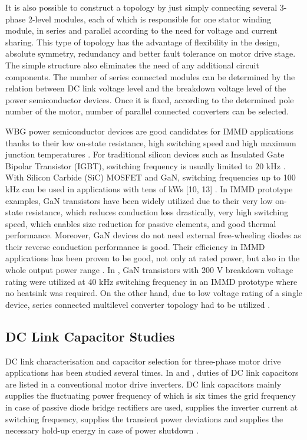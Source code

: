 \documentclass[conference,a4paper,twocolumn]{IEEEtran}
\begin{document}
It is also possible to construct a topology by just simply connecting several 3-phase 2-level modules, each of which is responsible for one stator winding module, in series and parallel according to the need for voltage and current sharing. This type of topology has the advantage of flexibility in the design, absolute symmetry, redundancy and better fault tolerance on motor drive stage. The simple structure also eliminates the need of any additional circuit components. The number of series connected modules can be determined by the relation between DC link voltage level and the breakdown voltage level of the power semiconductor devices. Once it is fixed, according to the determined pole number of the motor, number of parallel connected converters can be selected.

WBG power semiconductor devices are good candidates for IMMD applications thanks to their low on-state resistance, high switching speed and high maximum junction temperatures \cite{Morita2011}. For traditional silicon devices such as Insulated Gate Bipolar Transistor (IGBT), switching frequency is usually limited to 20 kHz \cite{Lambert2015a}. With Silicon Carbide (SiC) MOSFET and GaN, switching frequencies up to 100 kHz can be used in applications with tens of kWs [10, 13] \cite{Wang2015b,Morita2011}. In IMMD prototype examples, GaN transistors have been widely utilized due to their very low on-state resistance, which reduces conduction loss drastically, very high switching speed, which enables size reduction for passive elements, and good thermal performance. Moreover, GaN devices do not need external free-wheeling diodes as their reverse conduction performance is good. Their efficiency in IMMD applications has been proven to be good, not only at rated power, but also in the whole output power range \cite{Morita2011}. In \cite{Wang2015b}, GaN transistors with 200 V breakdown voltage rating were utilized at 40 kHz switching frequency in an IMMD prototype where no heatsink was required. On the other hand, due to low voltage rating of a single device, series connected multilevel converter topology had to be utilized \cite{Wang2013}.

\subsection{DC Link Capacitor Studies}

DC link characterisation and capacitor selection for three-phase motor drive applications has been studied several times. In \cite{Bianchi2003} and \cite{Lee2007}, duties of DC link capacitors are listed in a conventional motor drive inverters. DC link capacitors mainly supplies the fluctuating power frequency of which is six times the grid frequency in case of passive diode bridge rectifiers are used, supplies the inverter current at switching frequency, supplies the transient power deviations and supplies the necessary hold-up energy in case of power shutdown \cite{Bianchi2003}.
\end{document}
